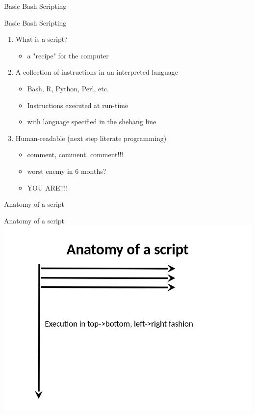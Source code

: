 \documentclass[t,10pt]{beamer}
\begin{document}
\begin{frame}[label={sec:orgheadline3}]{Basic Bash Scripting}
\end{frame}
\begin{frame}[label={sec:orgheadline4}]{Basic Bash Scripting}
\begin{enumerate}[<+->]
\item What is a script?
\begin{itemize}
\item a "recipe" for the computer \vspace{0.25in}
\end{itemize}
\item A collection of instructions in an \alert{interpreted language}
\begin{itemize}
\item Bash, R, Python, Perl, etc.
\item Instructions executed at run-time
\item with language specified in the shebang line \vspace{0.25in}
\end{itemize}
\item Human-readable (next step literate programming)
\begin{itemize}
\item comment, comment, comment!!!
\item worst enemy in 6 months?
\item YOU ARE!!!! \vspace{0.25in}
\end{itemize}
\end{enumerate}
\end{frame}
\begin{frame}[label={sec:orgheadline5}]{Anatomy of a script}
\end{frame}
\begin{frame}[label={sec:orgheadline6}]{Anatomy of a script}
\includegraphics[width=.9\linewidth]{figures/1_anatomy_shell_script.png}
\end{frame}
\end{document}
